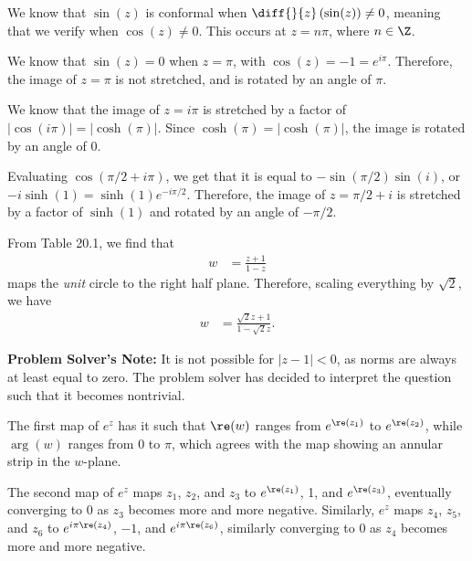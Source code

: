 \documentclass[10pt]{mypackage}
\begin{document}
\RaggedRight
\begin{solution}[20.1]
  We know that $\sin(z)$ is conformal when $\diff{}{z}\left( \sin(z) \right) \neq 0$, meaning that we verify when $\cos(z) \neq 0$. This occurs at $z = n\pi$, where $n\in \Z$.\newline

  We know that $\sin(z) = 0$ when $z = \pi$, with $\cos(z) = -1 = e^{i\pi}$. Therefore, the image of $z = \pi$ is not stretched, and is rotated by an angle of $\pi$.\newline

  We know that the image of $z = i\pi$ is stretched by a factor of $\left\vert \cos\left( i\pi \right) \right\vert = \left\vert \cosh\left( \pi \right) \right\vert$. Since $\cosh\left( \pi \right) = \left\vert \cosh\left( \pi \right) \right\vert$, the image is rotated by an angle of $0$.\newline

  Evaluating $\cos\left( \pi/2 + i\pi\right)$, we get that it is equal to $-\sin\left( \pi/2 \right)\sin\left( i \right)$, or $-i\sinh(1) = \sinh(1)e^{-i\pi/2}$. Therefore, the image of $z = \pi/2 + i$ is stretched by a factor of $\sinh(1)$ and rotated by an angle of $-\pi/2$.
\end{solution}
\begin{solution}[20.9]
  From Table 20.1, we find that
  \begin{align*}
    w &= \frac{z+1}{1-z}
  \end{align*}
  maps the \textit{unit} circle to the right half plane. Therefore, scaling everything by $\sqrt{2}$, we have
  \begin{align*}
    w &= \frac{\sqrt{2}z + 1}{1 - \sqrt{2}z}.
  \end{align*}
\end{solution}
{\tiny \textbf{Problem Solver's Note:} It is not possible for $\left\vert z-1 \right\vert < 0$, as norms are always at least equal to zero. The problem solver has decided to interpret the question such that it becomes nontrivial.}
\begin{solution}[20.10]
  The first map of $e^z$ has it such that $\re(w)$ ranges from $e^{\re\left(z_1\right)}$ to $e^{\re\left( z_2 \right)}$, while $\arg(w)$ ranges from $0$ to $\pi$, which agrees with the map showing an annular strip in the $w$-plane.\newline

  The second map of $e^{z}$ maps $z_1$, $z_2$, and $z_3$ to $e^{\re\left( z_1 \right)}$, 1, and $e^{\re\left( z_3 \right)}$, eventually converging to $0$ as $z_3$ becomes more and more negative. Similarly, $e^{z}$ maps $z_4$, $z_5$, and $z_6$ to $e^{i\pi\re\left( z_4 \right)}$, $-1$, and $e^{i\pi\re\left( z_6 \right)}$, similarly converging to $0$ as $z_4$ becomes more and more negative.
\end{solution}
\end{document}
